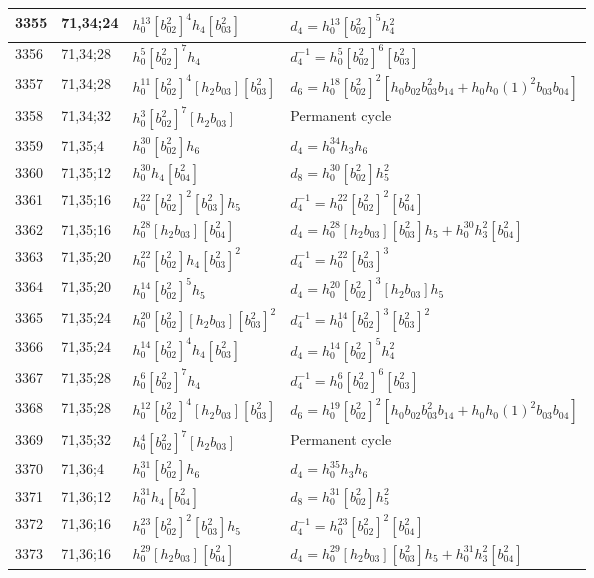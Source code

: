 \documentclass{article}
\begin{document}
\begin{longtable}{|l|l|>{\raggedright\arraybackslash}p{6cm}|>{\raggedright\arraybackslash}p{6cm}|}
3355 & 71,34;24 & $h_0^{13}[b_{02}^2]^4h_4[b_{03}^2]$ &$d_{4}=h_0^{13}[b_{02}^2]^5h_4^2$\\
\hline
3356 & 71,34;28 & $h_0^5[b_{02}^2]^7h_4$ & $d_{4}^{-1}=h_0^5[b_{02}^2]^6[b_{03}^2]$\\
3357 & 71,34;28 & $h_0^{11}[b_{02}^2]^4[h_2b_{03}][b_{03}^2]$ &$d_{6}=h_0^{18}[b_{02}^2]^2[h_0b_{02}b_{03}^2b_{14} + h_0h_0(1)^2b_{03}b_{04}]$\\
\hline
3358 & 71,34;32 & $h_0^3[b_{02}^2]^7[h_2b_{03}]$ & Permanent cycle\\
\hline
3359 & 71,35;4 & $h_0^{30}[b_{02}^2]h_6$ &$d_{4}=h_0^{34}h_3h_6$\\
\hline
3360 & 71,35;12 & $h_0^{30}h_4[b_{04}^2]$ &$d_{8}=h_0^{30}[b_{02}^2]h_5^2$\\
\hline
3361 & 71,35;16 & $h_0^{22}[b_{02}^2]^2[b_{03}^2]h_5$ & $d_{4}^{-1}=h_0^{22}[b_{02}^2]^2[b_{04}^2]$\\
3362 & 71,35;16 & $h_0^{28}[h_2b_{03}][b_{04}^2]$ &$d_{4}=h_0^{28}[h_2b_{03}][b_{03}^2]h_5 + h_0^{30}h_3^2[b_{04}^2]$\\
\hline
3363 & 71,35;20 & $h_0^{22}[b_{02}^2]h_4[b_{03}^2]^2$ & $d_{4}^{-1}=h_0^{22}[b_{03}^2]^3$\\
3364 & 71,35;20 & $h_0^{14}[b_{02}^2]^5h_5$ &$d_{4}=h_0^{20}[b_{02}^2]^3[h_2b_{03}]h_5$\\
\hline
3365 & 71,35;24 & $h_0^{20}[b_{02}^2][h_2b_{03}][b_{03}^2]^2$ & $d_{4}^{-1}=h_0^{14}[b_{02}^2]^3[b_{03}^2]^2$\\
3366 & 71,35;24 & $h_0^{14}[b_{02}^2]^4h_4[b_{03}^2]$ &$d_{4}=h_0^{14}[b_{02}^2]^5h_4^2$\\
\hline
3367 & 71,35;28 & $h_0^6[b_{02}^2]^7h_4$ & $d_{4}^{-1}=h_0^6[b_{02}^2]^6[b_{03}^2]$\\
3368 & 71,35;28 & $h_0^{12}[b_{02}^2]^4[h_2b_{03}][b_{03}^2]$ &$d_{6}=h_0^{19}[b_{02}^2]^2[h_0b_{02}b_{03}^2b_{14} + h_0h_0(1)^2b_{03}b_{04}]$\\
\hline
3369 & 71,35;32 & $h_0^4[b_{02}^2]^7[h_2b_{03}]$ & Permanent cycle\\
\hline
3370 & 71,36;4 & $h_0^{31}[b_{02}^2]h_6$ &$d_{4}=h_0^{35}h_3h_6$\\
\hline
3371 & 71,36;12 & $h_0^{31}h_4[b_{04}^2]$ &$d_{8}=h_0^{31}[b_{02}^2]h_5^2$\\
\hline
3372 & 71,36;16 & $h_0^{23}[b_{02}^2]^2[b_{03}^2]h_5$ & $d_{4}^{-1}=h_0^{23}[b_{02}^2]^2[b_{04}^2]$\\
3373 & 71,36;16 & $h_0^{29}[h_2b_{03}][b_{04}^2]$ &$d_{4}=h_0^{29}[h_2b_{03}][b_{03}^2]h_5 + h_0^{31}h_3^2[b_{04}^2]$\\

\end{longtable}
\end{document}
